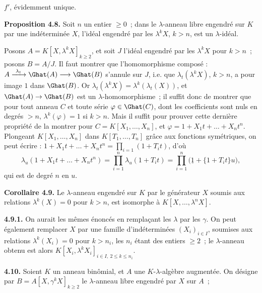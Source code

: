 \(f'\),
évidemment unique.

\textbf{Proposition 4.8.} Soit \(n\) un entier \(\ge0\)~; dans le \(\lambda\)-anneau libre engendré sur \(K\) par une indéterminée \(X\), l'idéal engendré par les \(\lambda^k X\), \(k>n\), est un \(\lambda\)-idéal.

Posons \(A=K[X,\lambda^k X]_{k\ge2}\), et soit \(J\) l'idéal engendré par les \(\lambda^k X\) pour \(k>n\)~; posons \(B=A/J\). Il faut montrer que l'homomorphisme composé : \(A\xrightarrow{\ \lambda_t\ }\Ghat(A)\longrightarrow\Ghat(B)\) s'annule sur \(J\), i.e. que \(\lambda_t(\lambda^k X)\), \(k>n\), a pour image \(1\) dans \(\Ghat(B)\). Or \(\lambda_t(\lambda^k X)=\lambda^k(\lambda_t(X))\), et \(\Ghat(A)\to\Ghat(B)\) est un \(\lambda\)-homomorphisme~; il suffit donc de montrer que pour tout anneau \(C\) et toute série \(\varphi\in\Ghat(C)\), dont les coefficients sont nuls en degrés \(>n\), \(\lambda^k(\varphi)=1\) si \(k>n\). Mais il suffit pour prouver cette dernière propriété de la montrer pour \(C=K[X_1,\ldots,X_n]\), et \(\varphi=1+X_1t+\ldots+X_nt^n\). Plongeant \(K[X_1,\ldots,X_n]\) dans \(K[T_1,\ldots,T_n]\) grâce aux fonctions symétriques, on peut écrire : \(1+X_1t+\ldots+X_nt^n=\prod_{i=1}(1+T_it)\), d'où
\[
  \lambda_u(1+X_1t+\ldots+X_nt^n)=\prod_{i=1}^{n}\lambda_u(1+T_it)=\prod_{i=1}^{n}\bigl(\underline{1}+\{1+T_it\}u\bigr),
\]
qui est de degré \(n\) en \(u\).

\textbf{Corollaire 4.9.} Le \(\lambda\)-anneau engendré sur \(K\) par le générateur \(X\) soumis aux relations \(\lambda^k(X)=0\) pour \(k>n\), est isomorphe à \(K[X,\ldots,\lambda^n X]\).

\textbf{4.9.1.} On aurait les mêmes énoncés en remplaçant les \(\lambda\) par les \(\gamma\). On peut également remplacer \(X\) par une famille d'indéterminées \((X_i)_{i\in I}\), soumises aux relations \(\lambda^k(X_i)=0\) pour \(k>n_i\), les \(n_i\) étant des entiers \(\ge2\)~; le \(\lambda\)-anneau obtenu est alors \(K[X_i,\lambda^k X_i]_{i\in I,\ 2\le k\le n_i}\).

\textbf{4.10.} Soient \(K\) un anneau binômial, et \(A\) une \(K\)-\(\lambda\)-algèbre augmentée. On désigne par \(B=A[X,\gamma^k X]_{k\ge2}\) le \(\lambda\)-anneau libre engendré par \(X\) sur \(A\)~; 
